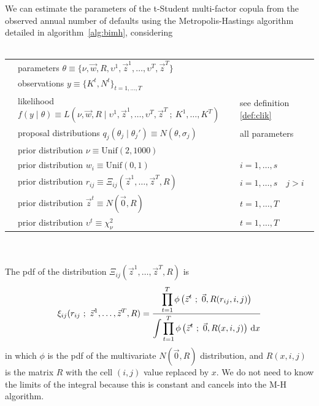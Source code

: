 \documentclass[11pt,fleqn]{book} %
\begin{document}
\begin{proposition}
	\label{prop:pemh}
	We can estimate the parameters of the t-Student multi-factor copula from 
	the observed annual number of defaults using the Metropolis-Hastings 
	algorithm detailed in algorithm~\ref{alg:bimh}, considering
~\\
~\\
\begin{listliketab} 
	\begin{tabular}{Lll}
		\textbullet & parameters $\theta \equiv \{ \nu,\vec{w},R,\upsilon^1,\vec{z}^1,\dots,\upsilon^T,\vec{z}^T\}$ & \\
		\textbullet & observations $y \equiv \{K^t, N^t\}_{t=1,\dots,T}$ & \\
		\textbullet & likelihood $f(y \mid \theta) \equiv L(\nu,\vec{w},R  \mid \upsilon^1,\vec{z}^1,\dots,\upsilon^T,\vec{z}^T\ ;\ K^1,\dots,K^T)$ & see definition \ref{def:clik} \\
		\textbullet & proposal distributions $q_j(\theta_j \mid \theta_j') \equiv N(\theta,\sigma_j)$ & all parameters\\
		\textbullet & prior distribution $\nu \equiv \text{Unif}(2,1000)$ & \\
		\textbullet & prior distribution $w_i \equiv \text{Unif}(0,1)$ & $i=1,\dots,s$ \\
		\textbullet & prior distribution $r_{ij} \equiv \Xi_{ij}(\vec{z}^1,\dots,\vec{z}^T,R)$ & $i=1,\dots,s \quad j>i$ \\ %
		\textbullet & prior distribution $\vec{z}^t \equiv N(\vec{0},R)$ & $t=1,\dots,T$ \\
		\textbullet & prior distribution $\upsilon^t \equiv \chi_{\nu}^2$ & $t=1,\dots,T$ \\
	\end{tabular}
\end{listliketab}
~\\
~\\
	The pdf of the distribution $\Xi_{ij}(\vec{z}^1,\dots,\vec{z}^T,R)$ is
	\begin{displaymath}
		\xi_{ij}(r_{ij}\ ;\ \vec{z}^1,\dots,\vec{z}^T,R) = \frac
		{\displaystyle \prod_{t=1}^{T} \phi\left( \vec{z}^t\ ;\ \vec{0}, R(r_{ij},i,j) \right)}
		{\displaystyle \int \prod_{t=1}^{T} \phi\left( \vec{z}^t\ ;\ \vec{0}, R(x,i,j) \right) \ud x}
	\end{displaymath}
	in which $\phi$ is the pdf of the multivariate $N(\vec{0},R)$ distribution,
	and $R(x,i,j)$ is the matrix $R$ with the cell $(i,j)$ value 
	replaced by $x$. We do not need to know the limits of the integral
	because this is constant and cancels into the M-H algorithm.
\end{proposition}
\end{document}
